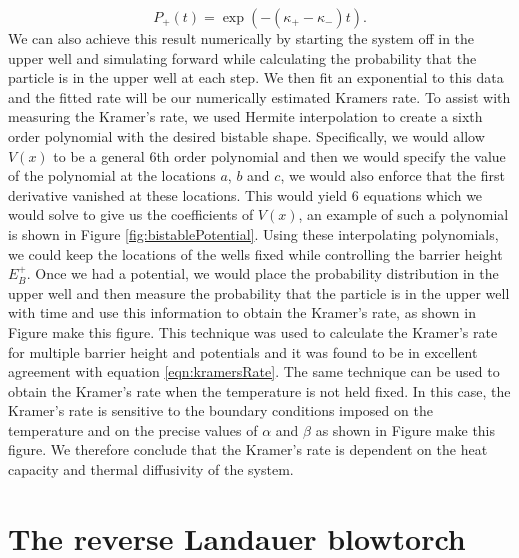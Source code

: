 \begin{equation}
P_+(t) = \exp{(-(\kappa_+ - \kappa_- )t)}.
\end{equation}
We can also achieve this result numerically by starting the system off in the upper well and simulating forward while calculating the probability that the particle is in the upper well at each step. We then fit an exponential to this data and the fitted rate will be our numerically estimated Kramers rate. To assist with measuring the Kramer's rate, we used Hermite interpolation to create a sixth order polynomial with the desired bistable shape. Specifically, we would allow $V(x)$ to be a general 6th order polynomial and then we would specify the value of the polynomial at the locations $a$, $b$ and $c$, we would also enforce that the first derivative vanished at these locations. This would yield 6 equations which we would solve to give us the coefficients of $V(x)$, an example of such a polynomial is shown in Figure \ref{fig:bistablePotential}. Using these interpolating polynomials, we could keep the locations of the wells fixed while controlling the barrier height $E_B^+$. Once we had a potential, we would place the probability distribution in the upper well and then measure the probability that the particle is in the upper well with time and use this information to obtain the Kramer's rate, as shown in Figure {\color{red} make this figure}. This technique was used to calculate the Kramer's rate for multiple barrier height and potentials and it was found to be in excellent agreement with equation \ref{eqn:kramersRate}. The same technique can be used to obtain the Kramer's rate when the temperature is not held fixed. In this case, the Kramer's rate is sensitive to the boundary conditions imposed on the temperature and on the precise values of $\alpha$ and $\beta$ as shown in Figure {\color{red} make this figure}. We therefore conclude that the Kramer's rate is dependent on the heat capacity and thermal diffusivity of the system.

\section{The reverse Landauer blowtorch}

